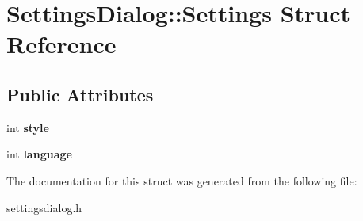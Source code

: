\hypertarget{struct_settings_dialog_1_1_settings}{}\section{Settings\+Dialog\+:\+:Settings Struct Reference}
\label{struct_settings_dialog_1_1_settings}
\subsection*{Public Attributes}
\begin{DoxyCompactItemize}
\item 
\hypertarget{struct_settings_dialog_1_1_settings_a5f026eb24c2e78595c4e67ef5bd137c0}{}int {\bfseries style}\label{struct_settings_dialog_1_1_settings_a5f026eb24c2e78595c4e67ef5bd137c0}

\item 
\hypertarget{struct_settings_dialog_1_1_settings_af4430b9479a649af088e985f8e7d7c27}{}int {\bfseries language}\label{struct_settings_dialog_1_1_settings_af4430b9479a649af088e985f8e7d7c27}

\end{DoxyCompactItemize}


The documentation for this struct was generated from the following file\+:\begin{DoxyCompactItemize}
\item 
settingsdialog.\+h\end{DoxyCompactItemize}
